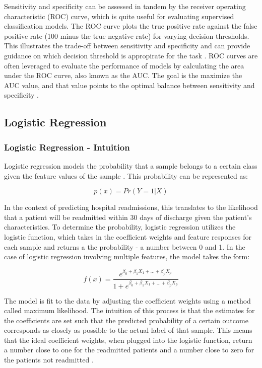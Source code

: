 \documentclass[sigconf]{acmart}
\begin{document}
Sensitivity and specificity can be assessed in tandem by the receiver operating characteristic (ROC) curve, which is quite useful for evaluating supervised classification models. The ROC curve plots the true positive rate against the false positive rate (100 minus the true negative rate) for varying decision thresholds. This illustrates the trade-off between sensitivity and specificity and can provide guidance on which decision threshold is appropirate for the task \cite{cite12}. ROC curves are often leveraged to evaluate the performance of models by calculating the area under the ROC curve, also known as the AUC. The goal is the maximize the AUC value, and that value points to the optimal balance between sensitivity and specificity \cite{cite12}.

\subsection{Logistic Regression}

\subsubsection{Logistic Regression - Intuition}

Logistic regression models the probability that a sample belongs to a certain class given the feature values of the sample \cite{cite08}. This probability can be represented as:

\[p(x) = Pr(Y = 1 | X)\]

In the context of predicting hospital readmissions, this translates to the likelihood that a patient will be readmitted within 30 days of discharge given the patient's characteristics. To determine the probability, logistic regression utilizes the logistic function, which takes in the coefficient weights and feature responses for each sample and returns a the probability - a number between 0 and 1\cite{cite08}. In the case of logistic regression involving multiple features, the model takes the form:

\[ f(x) =\frac{e^{\beta_0 + \beta_1X_1 + ... + \beta_pX_p}}{1 + e^{\beta_0 + \beta_1X_1 + ... + \beta_pX_p}}  \]

The model is fit to the data by adjusting the coefficient weights using a method called maximum likelihood. The intuition of this process is that the estimates for the coefficients are set such that the predicted probability of a certain outcome corresponds as closely as possible to the actual label of that sample. This means that the ideal coefficient weights, when plugged into the logistic function, return a number close to one for the readmitted patients and a number close to zero for the patients not readmitted \cite{cite08}.
\end{document}
